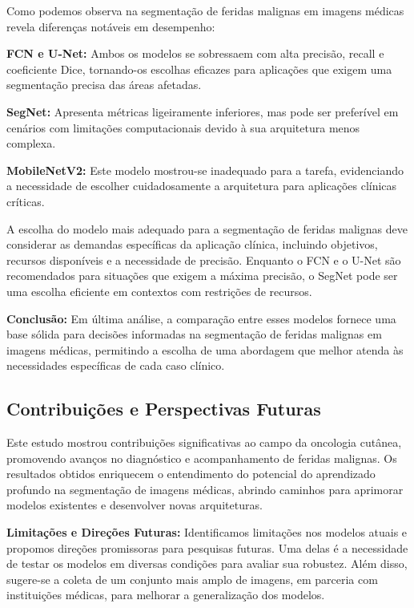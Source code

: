 Como podemos observa na segmentação de feridas malignas em imagens médicas revela diferenças notáveis em desempenho:

\textbf{\ac{FCN} e \ac{U-Net}:} Ambos os modelos se sobressaem com alta precisão, recall e coeficiente Dice, tornando-os escolhas eficazes para aplicações que exigem uma segmentação precisa das áreas afetadas.

\textbf{\ac{SegNet}:} Apresenta métricas ligeiramente inferiores, mas pode ser preferível em cenários com limitações computacionais devido à sua arquitetura menos complexa.

\textbf{\ac{MobileNetV2}:} Este modelo mostrou-se inadequado para a tarefa, evidenciando a necessidade de escolher cuidadosamente a arquitetura para aplicações clínicas críticas.




A escolha do modelo mais adequado para a segmentação de feridas malignas deve considerar as demandas específicas da aplicação clínica, incluindo objetivos, recursos disponíveis e a necessidade de precisão. Enquanto o \ac{FCN} e o \ac{U-Net} são recomendados para situações que exigem a máxima precisão, o \ac{SegNet} pode ser uma escolha eficiente em contextos com restrições de recursos.


\textbf{Conclusão:} Em última análise, a comparação entre esses modelos fornece uma base sólida para decisões informadas na segmentação de feridas malignas em imagens médicas, permitindo a escolha de uma abordagem que melhor atenda às necessidades específicas de cada caso clínico.

\subsection{Contribuições e Perspectivas Futuras}

    Este estudo mostrou contribuições significativas ao campo da oncologia cutânea, promovendo avanços no diagnóstico e acompanhamento de feridas malignas. Os resultados obtidos enriquecem o entendimento do potencial do aprendizado profundo na segmentação de imagens médicas, abrindo caminhos para aprimorar modelos existentes e desenvolver novas arquiteturas.

    \textbf{Limitações e Direções Futuras:} Identificamos limitações nos modelos atuais e propomos direções promissoras para pesquisas futuras. Uma delas é a necessidade de testar os modelos em diversas condições para avaliar sua robustez. Além disso, sugere-se a coleta de um conjunto mais amplo de imagens, em parceria com instituições médicas, para melhorar a generalização dos modelos.

